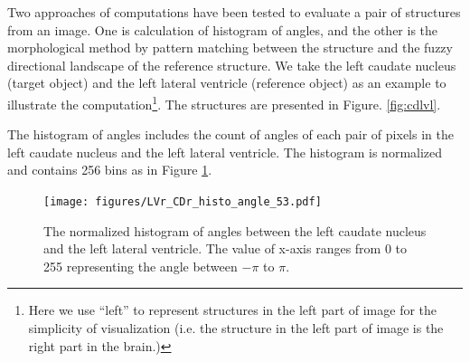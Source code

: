 \documentclass{article}
\begin{document}
Two approaches of computations have been tested to evaluate a pair of structures from an image.
One is calculation of histogram of angles, and  the other is the morphological method by pattern matching between the structure and  the fuzzy directional landscape of the reference structure.
We take the left caudate nucleus (target object) and the left lateral ventricle (reference object) as an example to illustrate the computation\footnote{Here we use ``left'' to represent 
structures in the left part of image for the simplicity of visualization (i.e. the structure in the left part of image is the right part in the brain.)}.
The structures are presented in Figure. \ref{fig:cdlvl}.

The histogram of angles includes the count of angles of each pair of pixels in the left caudate nucleus and the left lateral ventricle.
The histogram is normalized and contains 256 bins as in Figure \ref{fig:histogram_angle}.
\begin{figure}
  \centering
  \texttt{[image: figures/LVr\_CDr\_histo\_angle\_53.pdf]}
  \caption{The normalized histogram of angles between the left caudate nucleus and the left lateral ventricle.
  The value of x-axis ranges from 0 to 255 representing the angle between $-\pi$ to $\pi$.}  \label{fig:histogram_angle}
\end{figure}
\end{document}
